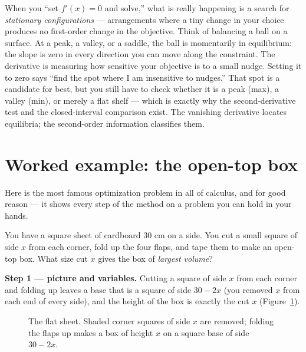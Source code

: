 \begin{happeningbox}
When you ``set $f'(x)=0$ and solve,'' what is really happening is a search for
\emph{stationary configurations} --- arrangements where a tiny change in your choice
produces no first-order change in the objective. Think of balancing a ball on a
surface. At a peak, a valley, or a saddle, the ball is momentarily in equilibrium:
the slope is zero in every direction you can move along the constraint. The
derivative is measuring how sensitive your objective is to a small nudge. Setting it
to zero says ``find the spot where I am insensitive to nudges.'' That spot is a
candidate for best, but you still have to check whether it is a peak (max), a valley
(min), or merely a flat shelf --- which is exactly why the second-derivative test and
the closed-interval comparison exist. The vanishing derivative locates equilibria;
the second-order information classifies them.
\end{happeningbox}

\section{Worked example: the open-top box}

Here is the most famous optimization problem in all of calculus, and for good reason
--- it shows every step of the method on a problem you can hold in your hands.

\begin{example}\label{ch17:ex-box}
You have a square sheet of cardboard $30$ cm on a side. You cut a small square of
side $x$ from each corner, fold up the four flaps, and tape them to make an open-top
box. What size cut $x$ gives the box of \emph{largest volume}?
\end{example}

\textbf{Step 1 --- picture and variables.} Cutting a square of side $x$ from each
corner and folding up leaves a base that is a square of side $30-2x$ (you removed $x$
from each end of every side), and the height of the box is exactly the cut $x$
(Figure~\ref{ch17:fig-box}).

\begin{figure}[H]
\centering
{}
\caption{The flat sheet. Shaded corner squares of side $x$ are removed; folding the
flaps up makes a box of height $x$ on a square base of side $30-2x$.}
\label{ch17:fig-box}
\end{figure}

